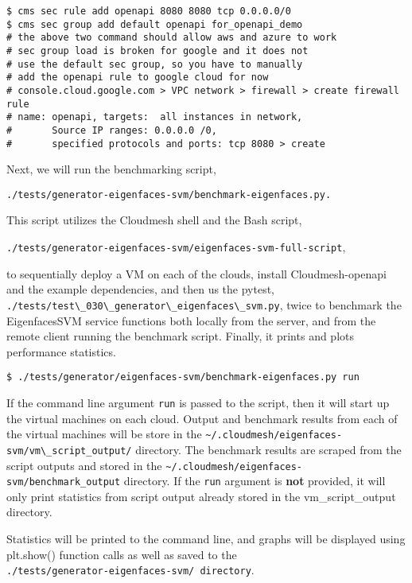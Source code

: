\begin{verbatim}
$ cms sec rule add openapi 8080 8080 tcp 0.0.0.0/0
$ cms sec group add default openapi for_openapi_demo
# the above two command should allow aws and azure to work
# sec group load is broken for google and it does not 
# use the default sec group, so you have to manually 
# add the openapi rule to google cloud for now
# console.cloud.google.com > VPC network > firewall > create firewall rule
# name: openapi, targets:  all instances in network, 
#       Source IP ranges: 0.0.0.0 /0, 
#       specified protocols and ports: tcp 8080 > create
\end{verbatim}

Next, we will run the benchmarking script,

\verb|./tests/generator-eigenfaces-svm/benchmark-eigenfaces.py.|

This script utilizes the Cloudmesh shell and the Bash script,

\verb|./tests/generator-eigenfaces-svm/eigenfaces-svm-full-script|,

to sequentially deploy a VM on each of the clouds, install
Cloudmesh-openapi and the example dependencies, and then us the
pytest, \\
\verb|./tests/test\_030\_generator\_eigenfaces\_svm.py|, twice to
benchmark the EigenfacesSVM service functions both locally from the
server, and from the remote client running the benchmark
script. Finally, it prints and plots performance statistics.

\begin{verbatim}
$ ./tests/generator/eigenfaces-svm/benchmark-eigenfaces.py run
\end{verbatim}

If the command line argument \verb|run| is passed to the script, then
it will start up the virtual machines on each cloud. Output and
benchmark results from each of the virtual machines will be store in the
\verb|~/.cloudmesh/eigenfaces-svm/vm\_script_output/| directory.
The benchmark results are scraped from the script outputs and stored in
the \verb|~/.cloudmesh/eigenfaces-svm/benchmark_output|
directory. If the \verb|run| argument is \textbf{not} provided, it
will only print statistics from script output already stored in the
vm\_script\_output directory.

Statistics will be printed to the command line, and graphs will be
displayed using plt.show() function calls as well as saved to the \\
\verb|./tests/generator-eigenfaces-svm/ directory|.

